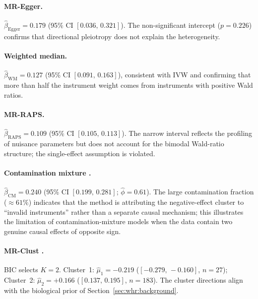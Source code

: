 \documentclass[12pt,a4paper]{article}
\begin{document}
\paragraph{MR-Egger.}
$\hat\beta_{\mathrm{Egger}} = 0.179$ (95\% CI $[0.036,\, 0.321]$).  The
non-significant intercept ($p = 0.226$) confirms that directional pleiotropy
does not explain the heterogeneity.

\paragraph{Weighted median.}
$\hat\beta_{\mathrm{WM}} = 0.127$ (95\% CI $[0.091,\, 0.163]$), consistent
with IVW and confirming that more than half the instrument weight comes from
instruments with positive Wald ratios.

\paragraph{MR-RAPS.}
$\hat\beta_{\mathrm{RAPS}} = 0.109$ (95\% CI $[0.105,\, 0.113]$).  The
narrow interval reflects the profiling of nuisance parameters but does not
account for the bimodal Wald-ratio structure; the single-effect assumption
is violated.

\paragraph{Contamination mixture \citep{Burgess2020}.}
$\hat\beta_{\mathrm{CM}} = 0.240$ (95\% CI $[0.199,\, 0.281]$;
$\hat\phi = 0.61$).  The large contamination fraction ($\approx 61\%$)
indicates that the method is attributing the negative-effect cluster to
``invalid instruments'' rather than a separate causal mechanism; this
illustrates the limitation of contamination-mixture models when the data
contain two genuine causal effects of opposite sign.

\paragraph{MR-Clust \citep{Foley2019}.}
BIC selects $K = 2$.  Cluster~1: $\hat\mu_{1} = -0.219$
($[-0.279,\, -0.160]$, $n = 27$); Cluster~2: $\hat\mu_{2} = +0.166$
($[0.137,\, 0.195]$, $n = 183$).  The cluster directions align with the
biological prior of Section~\ref{sec:whr:background}.
\end{document}
